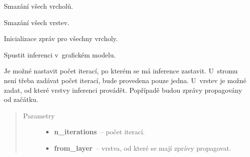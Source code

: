 \begin{fulllineitems}

\begin{fulllineitems}
\label{alex.infer:alex.infer.factor.alex.infer.lbp.LBP.clear_nodes}
Smazání všech vrcholů.

\end{fulllineitems}


\begin{fulllineitems}
\label{alex.infer:alex.infer.factor.alex.infer.lbp.LBP.clear_layers}
Smazání všech vrstev.

\end{fulllineitems}


\begin{fulllineitems}
\label{alex.infer:alex.infer.factor.alex.infer.lbp.LBP.init_messages}
Inicializace zpráv pro všechny vrcholy.

\end{fulllineitems}


\begin{fulllineitems}
\label{alex.infer:alex.infer.factor.alex.infer.lbp.LBP.run}\pysiglinewithargsret{\bfcode{run}}{\emph{n\_iterations=1, from\_layer{]}}}{}
Spustit inferenci v~grafickém modelu.

Je možné nastavit počet iterací, po kterém se má inference zastavit.
U~stromu není třeba zadávat počet iterací, bude provedena pouze jedna.
U~vrstev je možné zadat, od které vrstvy inferenci provádět.
Popřípadě budou zprávy propagovány od začátku.
\begin{quote}\begin{description}
\item[{Parametry}] \leavevmode\begin{itemize}
\item {} 
\textbf{n\_iterations}~-- počet iterací.

\item {} 
\textbf{from\_layer}~-- vrstva, od které se mají zprávy propagovat.

\end{itemize}

\end{description}\end{quote}

\end{fulllineitems}


\end{fulllineitems}
